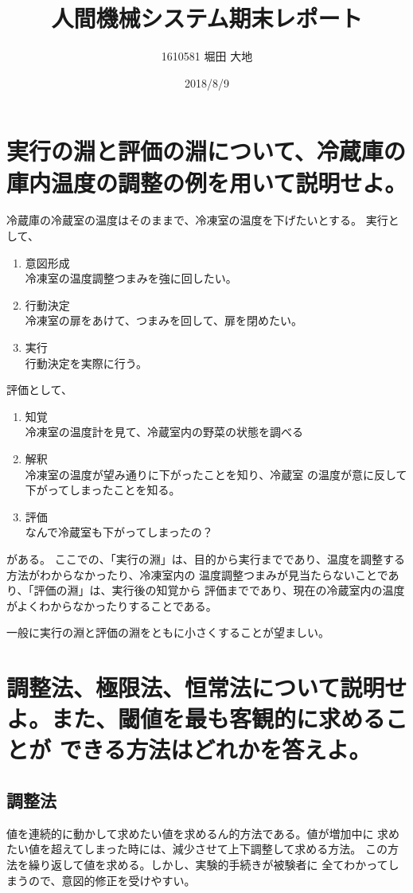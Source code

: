 \documentclass[twocolumn, 10pt,a4j]{jsarticle}
\title{\vspace{-2.5cm}人間機械システム期末レポート}
\author{1610581 堀田 大地}
\date{2018/8/9}
\begin{document}
\maketitle{}
\section{実行の淵と評価の淵について、冷蔵庫の庫内温度の調整の例を用いて説明せよ。}
  冷蔵庫の冷蔵室の温度はそのままで、冷凍室の温度を下げたいとする。
  実行として、
  \begin{enumerate}
    \item 意図形成 \\
      冷凍室の温度調整つまみを強に回したい。
    \item 行動決定 \\
      冷凍室の扉をあけて、つまみを回して、扉を閉めたい。
    \item 実行 \\
      行動決定を実際に行う。
  \end{enumerate}
  評価として、
  \begin{enumerate}
    \item 知覚 \\
      冷凍室の温度計を見て、冷蔵室内の野菜の状態を調べる
    \item 解釈 \\
      冷凍室の温度が望み通りに下がったことを知り、冷蔵室
      の温度が意に反して下がってしまったことを知る。
    \item 評価 \\
      なんで冷蔵室も下がってしまったの？
  \end{enumerate}
  がある。
  ここでの、「実行の淵」は、目的から実行までであり、温度を調整する方法がわからなかったり、冷凍室内の
  温度調整つまみが見当たらないことであり、「評価の淵」は、実行後の知覚から
  評価までであり、現在の冷蔵室内の温度がよくわからなかったりすることである。
  \par 一般に実行の淵と評価の淵をともに小さくすることが望ましい。

\section{調整法、極限法、恒常法について説明せよ。また、閾値を最も客観的に求めることが
できる方法はどれかを答えよ。}
  \subsection{調整法}
    値を連続的に動かして求めたい値を求めるん的方法である。値が増加中に
    求めたい値を超えてしまった時には、減少させて上下調整して求める方法。
    この方法を繰り返して値を求める。しかし、実験的手続きが被験者に
    全てわかってしまうので、意図的修正を受けやすい。
\end{document}
